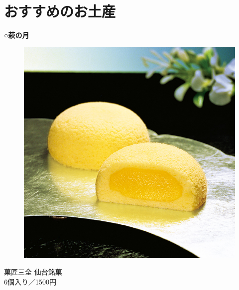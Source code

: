 \section{おすすめのお土産}
\begin{minipage}{0.45\textwidth}
	\textbf{○萩の月}
	\begin{figure}[H]
		\centering
		\includegraphics[width=0.6\linewidth]{img/haginotuki}
	\end{figure}
	\begin{center}
		{\scriptsize{菓匠三全 仙台銘菓\\6個入り／1500円}}
	\end{center}
	

\end{minipage}
